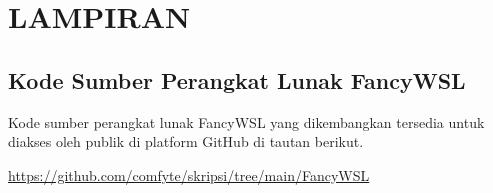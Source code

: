 \chapter*{LAMPIRAN}
\section{Kode Sumber Perangkat Lunak FancyWSL}

Kode sumber perangkat lunak FancyWSL yang dikembangkan tersedia untuk diakses oleh publik di platform GitHub di tautan berikut.

\href{https://github.com/comfyte/skripsi/tree/main/FancyWSL}{https://github.com/comfyte/skripsi/tree/main/FancyWSL}
